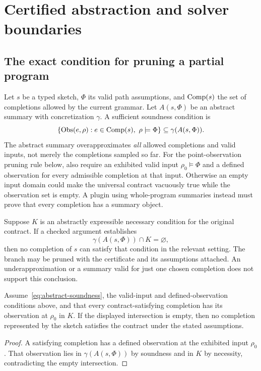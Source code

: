 \section{Certified abstraction and solver boundaries}\label{sec:abstraction}

\subsection{The exact condition for pruning a partial program}

Let $s$ be a typed sketch, $\Phi$ its valid path assumptions, and
$\operatorname{Comp}(s)$ the set of completions allowed by the current grammar. Let
$A(s,\Phi)$ be an abstract summary with concretization $\gamma$. A sufficient
soundness condition is
\begin{equation}\label{eq:abstract-soundness}
 \{\operatorname{Obs}(e,\rho):e\in\operatorname{Comp}(s),\ \rho\models\Phi\}
 \subseteq \gamma(A(s,\Phi)).
\end{equation}
The abstract summary overapproximates \emph{all} allowed completions and valid
inputs, not merely the completions sampled so far. For the point-observation
pruning rule below, also require an exhibited valid input $\rho_0\models\Phi$
and a defined observation for every admissible completion at that input.
Otherwise an empty input domain could make the universal contract vacuously
true while the observation set is empty. A plugin using whole-program summaries
instead must prove that every completion has a summary object.

Suppose $K$ is an abstractly expressible necessary condition for the original
contract. If a checked argument establishes
\[
 \gamma(A(s,\Phi))\cap K=\varnothing,
\]
then no completion of $s$ can satisfy that condition in the relevant setting.
The branch may be pruned with the certificate and its assumptions attached.
An underapproximation or a summary valid for just one chosen completion does
not support this conclusion.

\begin{proposition}
Assume~\eqref{eq:abstract-soundness}, the valid-input and defined-observation
conditions above, and that every contract-satisfying completion has its
observation at $\rho_0$ in $K$. If the displayed intersection is empty,
then no completion represented by the sketch satisfies the contract under the
stated assumptions.
\end{proposition}
\begin{proof}
A satisfying completion has a defined observation at the exhibited input
$\rho_0$. That observation lies in $\gamma(A(s,\Phi))$ by soundness and in $K$
by necessity, contradicting the empty intersection.
\end{proof}

